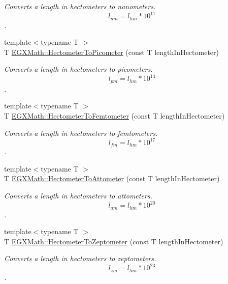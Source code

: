 \begin{DoxyCompactItemize}
\begin{DoxyCompactList}\small\item\em Converts a length in hectometers to nanometers. \[ l_{nm}=l_{hm} * 10^{11} \]. \end{DoxyCompactList}\item 
{\footnotesize template$<$typename T $>$ }\\T \mbox{\hyperlink{group___e_g_x_math-_conversions-_length_conversions-_s_i-_hectometer-_s_i_gaa45a09cd750ee4e48680332f0ce39f07}{E\+G\+X\+Math\+::\+Hectometer\+To\+Picometer}} (const T length\+In\+Hectometer)
\begin{DoxyCompactList}\small\item\em Converts a length in hectometers to picometers. \[ l_{pm}=l_{hm} * 10^{14} \]. \end{DoxyCompactList}\item 
{\footnotesize template$<$typename T $>$ }\\T \mbox{\hyperlink{group___e_g_x_math-_conversions-_length_conversions-_s_i-_hectometer-_s_i_gac1a1dfa64b70f5495ef5ea5c85b17677}{E\+G\+X\+Math\+::\+Hectometer\+To\+Femtometer}} (const T length\+In\+Hectometer)
\begin{DoxyCompactList}\small\item\em Converts a length in hectometers to femtometers. \[ l_{fm}=l_{hm} * 10^{17} \]. \end{DoxyCompactList}\item 
{\footnotesize template$<$typename T $>$ }\\T \mbox{\hyperlink{group___e_g_x_math-_conversions-_length_conversions-_s_i-_hectometer-_s_i_ga86348086f2a5b950cad06205d42bed4e}{E\+G\+X\+Math\+::\+Hectometer\+To\+Attometer}} (const T length\+In\+Hectometer)
\begin{DoxyCompactList}\small\item\em Converts a length in hectometers to attometers. \[ l_{am}=l_{hm} * 10^{20} \]. \end{DoxyCompactList}\item 
{\footnotesize template$<$typename T $>$ }\\T \mbox{\hyperlink{group___e_g_x_math-_conversions-_length_conversions-_s_i-_hectometer-_s_i_ga8ad2a40e4868b0a8de07e0e6f416f025}{E\+G\+X\+Math\+::\+Hectometer\+To\+Zeptometer}} (const T length\+In\+Hectometer)
\begin{DoxyCompactList}\small\item\em Converts a length in hectometers to zeptometers. \[ l_{zm}=l_{hm} * 10^{23} \]. \end{DoxyCompactList}\item 

\end{DoxyCompactItemize}
